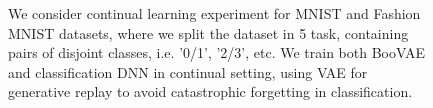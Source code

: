 \begin{figure}[t!]
	\centering
		\caption{We consider continual learning experiment for MNIST and Fashion MNIST datasets, where we split the dataset in 5 task, containing pairs of disjoint classes, i.e.  '0/1', '2/3', etc. We train both BooVAE and classification DNN in continual setting, using VAE for generative replay to avoid catastrophic forgetting in classification.}
		\label{fig:gen_relpay}
	\vspace*{\baselineskip}
\end{figure}


